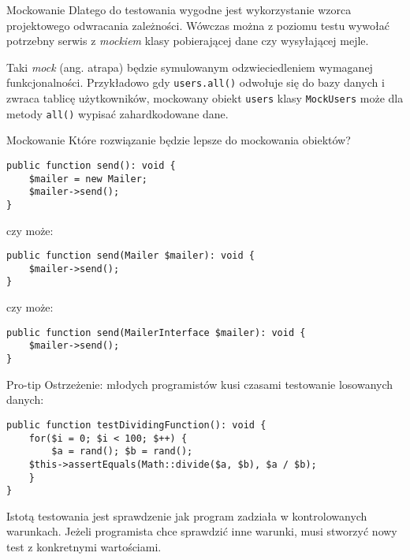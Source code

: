 \begin{frame}{Mockowanie}
	Dlatego do testowania wygodne jest wykorzystanie wzorca projektowego odwracania zależności. Wówczas można z poziomu testu wywołać potrzebny serwis z \emph{mockiem} klasy pobierającej dane czy wysyłającej mejle.
	
	Taki \emph{mock} (ang. atrapa) będzie symulowanym odzwieciedleniem wymaganej funkcjonalności. Przykładowo gdy \texttt{users.all()} odwołuje się do bazy danych i zwraca tablicę użytkowników, mockowany obiekt \texttt{users} klasy \texttt{MockUsers} może dla metody \texttt{all()} wypisać zahardkodowane dane.
\end{frame}

\begin{frame}[fragile]{Mockowanie}	
	Które rozwiązanie będzie lepsze do mockowania obiektów?
\begin{lstlisting}
public function send(): void {
    $mailer = new Mailer;
    $mailer->send();
}
\end{lstlisting}

	czy może:

\begin{lstlisting}
public function send(Mailer $mailer): void {
    $mailer->send();
}
\end{lstlisting}

	czy może:

\begin{lstlisting}
public function send(MailerInterface $mailer): void {
    $mailer->send();
}
\end{lstlisting}
\end{frame}

\begin{frame}[fragile]{Pro-tip}
	Ostrzeżenie: młodych programistów kusi czasami testowanie losowanych danych:
	
\begin{lstlisting}
public function testDividingFunction(): void {
    for($i = 0; $i < 100; $++) {
        $a = rand(); $b = rand();
	$this->assertEquals(Math::divide($a, $b), $a / $b);
    }
}
\end{lstlisting}

	Istotą testowania jest sprawdzenie jak program zadziała w kontrolowanych warunkach. Jeżeli programista chce sprawdzić inne warunki, musi stworzyć nowy test z konkretnymi wartościami.

\end{frame}

